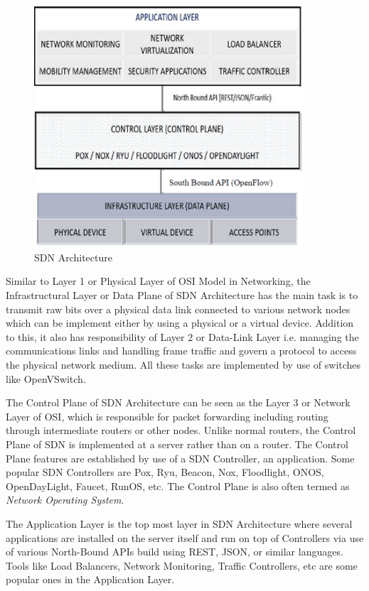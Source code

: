 \begin{figure}[!hbt]
    \centering
     \includegraphics[width=10cm,keepaspectratio]{images/SDN-architecture-example.png}
    \caption{SDN Architecture \cite{sdnimages}}
    \label{SDNArchitecure}
\end{figure}

    Similar to Layer 1 or Physical Layer of OSI Model in Networking, the Infrastructural Layer or Data Plane of SDN Architecture has the main task is to transmit raw bits over a physical data link connected to various network nodes which can be implement either by using a physical or a virtual device. Addition to this, it also has  responsibility of Layer 2 or Data-Link Layer i.e. managing the communications links and handling frame traffic and govern a protocol to access the physical network medium. All these tasks are implemented by use of switches like OpenVSwitch.

    The Control Plane of SDN Architecture can be seen as the Layer 3 or Network Layer of OSI, which is  responsible for packet forwarding including routing through intermediate routers or other nodes. Unlike normal routers, the Control Plane of SDN is implemented at a server rather than on a router. The Control Plane features are established by use of a SDN Controller, an application. Some popular SDN Controllers are Pox, Ryu, Beacon, Nox, Floodlight, ONOS, OpenDayLight, Faucet, RunOS, etc. The Control Plane is also often termed as \textit{Network Operating System}.

    The Application Layer is the top most layer in SDN Architecture where several applications are installed on the server itself and run on top of Controllers via use of various North-Bound APIs build using REST, JSON, or similar languages. Tools like Load Balancers, Network Monitoring, Traffic Controllers, etc are some popular ones in the Application Layer.

